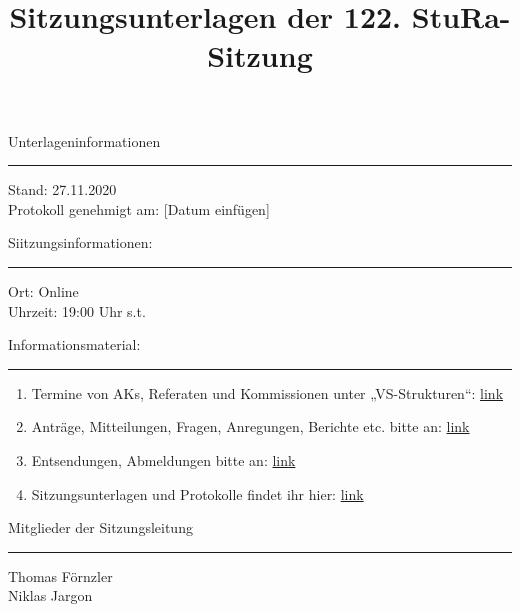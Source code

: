 \title{Sitzungsunterlagen der 122. StuRa-Sitzung}
\date{\vspace{-2em}\datum\vspace{-1em}} %
\maketitle

Unterlageninformationen
\vspace{.5em}\hrule\vspace{.5em}
Stand: 27.11.2020\\
Protokoll genehmigt am: [Datum einfügen]
\vspace{1.5em}

Siitzungsinformationen:
\vspace{.5em}\hrule\vspace{.5em}
Ort: Online\\
Uhrzeit: 19:00 Uhr s.t.
\vspace{1.5em}

Informationsmaterial:
\vspace{.5em}\hrule\vspace{.5em}
\begin{enumerate}
    \item Termine von AKs, Referaten und Kommissionen unter „VS-Strukturen“: \href{https://www.stura.uni-heidelberg.de}{link}
    \item Anträge, Mitteilungen, Fragen, Anregungen, Berichte etc. bitte an: \href{mailto:sitzungsleitung@stura.uni-heidelberg.de}{link}
    \item Entsendungen, Abmeldungen bitte an: \href{mailto:entsendung@stura.uni-heidelberg.de}{link}
    \item Sitzungsunterlagen und Protokolle findet ihr hier: \href{https://www.stura.uni-heidelberg.de/vs-strukturen/studierendenrat/protokolle-antraege-beschluesse-der-8-legislatur/}{link}
\end{enumerate}
\vspace{1.5em}

Mitglieder der Sitzungsleitung
\vspace{.5em}\hrule\vspace{.5em}
Thomas Förnzler\\
Niklas Jargon
\pagebreak 